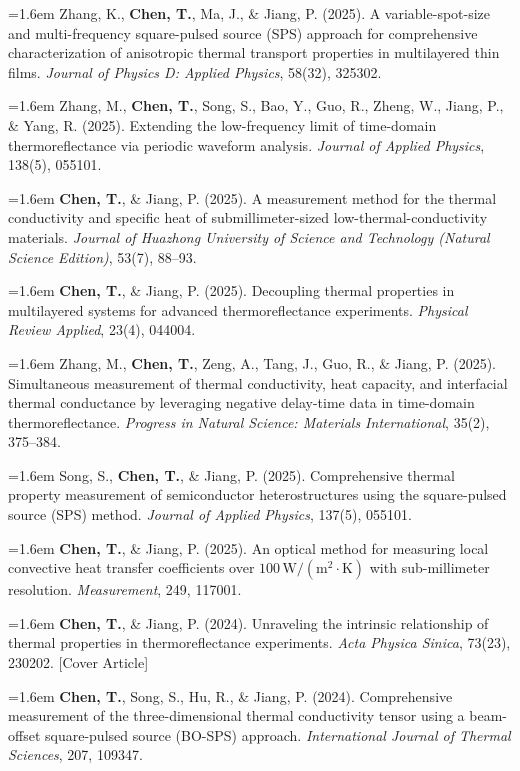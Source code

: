 \documentclass[10pt,a4paper]{article}
\newcommand{\pubitem}[1]{\par\noindent\hangindent=1.6em\hangafter=1 #1\par\addvspace{3pt}}
\begin{document}
\pubitem{Zhang, K., \textbf{Chen, T.}, Ma, J., \& Jiang, P. (2025). A variable-spot-size and multi-frequency square-pulsed source (SPS) approach for comprehensive characterization of anisotropic thermal transport properties in multilayered thin films. \textit{Journal of Physics D: Applied Physics}, 58(32), 325302.}

\pubitem{Zhang, M., \textbf{Chen, T.}, Song, S., Bao, Y., Guo, R., Zheng, W., Jiang, P., \& Yang, R. (2025). Extending the low-frequency limit of time-domain thermoreflectance via periodic waveform analysis. \textit{Journal of Applied Physics}, 138(5), 055101.}

\pubitem{\textbf{Chen, T.}, \& Jiang, P. (2025). A measurement method for the thermal conductivity and specific heat of submillimeter-sized low-thermal-conductivity materials. \textit{Journal of Huazhong University of Science and Technology (Natural Science Edition)}, 53(7), 88--93.}

\pubitem{\textbf{Chen, T.}, \& Jiang, P. (2025). Decoupling thermal properties in multilayered systems for advanced thermoreflectance experiments. \textit{Physical Review Applied}, 23(4), 044004.}

\pubitem{Zhang, M., \textbf{Chen, T.}, Zeng, A., Tang, J., Guo, R., \& Jiang, P. (2025). Simultaneous measurement of thermal conductivity, heat capacity, and interfacial thermal conductance by leveraging negative delay-time data in time-domain thermoreflectance. \textit{Progress in Natural Science: Materials International}, 35(2), 375--384.}

\pubitem{Song, S., \textbf{Chen, T.}, \& Jiang, P. (2025). Comprehensive thermal property measurement of semiconductor heterostructures using the square-pulsed source (SPS) method. \textit{Journal of Applied Physics}, 137(5), 055101.}

\pubitem{\textbf{Chen, T.}, \& Jiang, P. (2025). An optical method for measuring local convective heat transfer coefficients over $100\,\mathrm{W/(m^2{\cdot}K)}$ with sub-millimeter resolution. \textit{Measurement}, 249, 117001.}

\pubitem{\textbf{Chen, T.}, \& Jiang, P. (2024). Unraveling the intrinsic relationship of thermal properties in thermoreflectance experiments. \textit{Acta Physica Sinica}, 73(23), 230202. [Cover Article]}

\pubitem{\textbf{Chen, T.}, Song, S., Hu, R., \& Jiang, P. (2024). Comprehensive measurement of the three-dimensional thermal conductivity tensor using a beam-offset square-pulsed source (BO-SPS) approach. \textit{International Journal of Thermal Sciences}, 207, 109347.}
\end{document}

